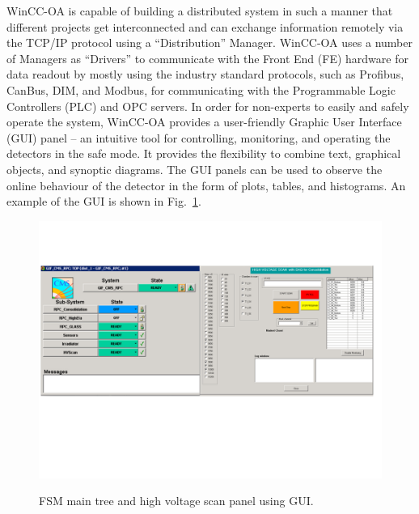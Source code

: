 WinCC-OA is capable of building a distributed system in such a manner that different projects get interconnected and can exchange information remotely via the TCP/IP protocol using a ``Distribution'' Manager.
WinCC-OA uses a number of Managers as ``Drivers'' to communicate with the Front End (FE) hardware for data readout by mostly using the industry standard protocols, such as Profibus, CanBus, DIM, and Modbus, for communicating with the Programmable Logic Controllers (PLC) and OPC servers.
In order for non-experts to easily and safely operate the system, WinCC-OA provides a user-friendly Graphic User Interface (GUI) panel – an intuitive tool for controlling, monitoring, and operating the detectors in the safe mode. It provides the flexibility to combine text, graphical objects, and synoptic diagrams. The GUI panels can be used to observe the online behaviour of the detector in the form of plots, tables, and histograms. An example of the GUI is shown in Fig.~\ref{fig:gui}.
\begin{figure}[h]
\centering
\includegraphics[scale=0.5,trim=0 175 10 80,clip]{fig/wincc/GUI2.png}\\
 \caption{FSM main tree and high voltage scan panel using GUI.}
\label{fig:gui}
\end{figure}

